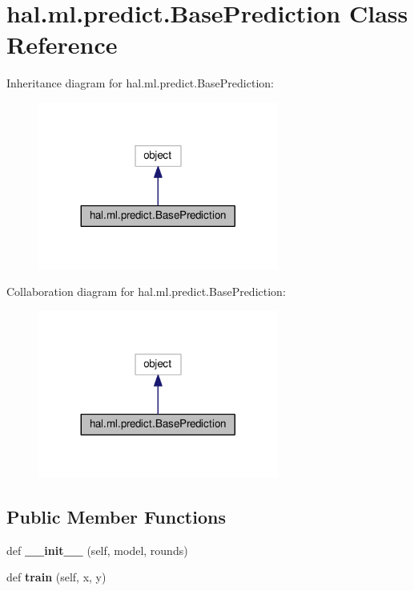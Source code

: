 \hypertarget{classhal_1_1ml_1_1predict_1_1_base_prediction}{}\section{hal.\+ml.\+predict.\+Base\+Prediction Class Reference}
\label{classhal_1_1ml_1_1predict_1_1_base_prediction}


Inheritance diagram for hal.\+ml.\+predict.\+Base\+Prediction\+:
\nopagebreak
\begin{figure}[H]
\begin{center}
\leavevmode
\includegraphics[width=224pt]{classhal_1_1ml_1_1predict_1_1_base_prediction__inherit__graph}
\end{center}
\end{figure}


Collaboration diagram for hal.\+ml.\+predict.\+Base\+Prediction\+:
\nopagebreak
\begin{figure}[H]
\begin{center}
\leavevmode
\includegraphics[width=224pt]{classhal_1_1ml_1_1predict_1_1_base_prediction__coll__graph}
\end{center}
\end{figure}
\subsection*{Public Member Functions}
\begin{DoxyCompactItemize}
\item 
def {\bfseries \+\_\+\+\_\+init\+\_\+\+\_\+} (self, model, rounds)\hypertarget{classhal_1_1ml_1_1predict_1_1_base_prediction_a77743bfb5de4846d30d3f41e7d2706df}{}\label{classhal_1_1ml_1_1predict_1_1_base_prediction_a77743bfb5de4846d30d3f41e7d2706df}

\item 
def {\bfseries train} (self, x, y)\hypertarget{classhal_1_1ml_1_1predict_1_1_base_prediction_a3bee607838f71f2ed205864a3f73d5f5}{}\label{classhal_1_1ml_1_1predict_1_1_base_prediction_a3bee607838f71f2ed205864a3f73d5f5}

\end{DoxyCompactItemize}
